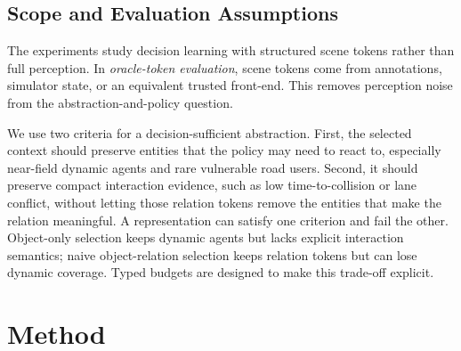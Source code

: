 \documentclass[10pt,journal,compsoc]{IEEEtran}
\begin{document}

\subsection{Scope and Evaluation Assumptions}
The experiments study decision learning with structured scene tokens rather than full perception. In \emph{oracle-token evaluation}, scene tokens come from annotations, simulator state, or an equivalent trusted front-end. This removes perception noise from the abstraction-and-policy question. 


We use two criteria for a decision-sufficient abstraction. First, the selected context should preserve entities that the policy may need to react to, especially near-field dynamic agents and rare vulnerable road users. Second, it should preserve compact interaction evidence, such as low time-to-collision or lane conflict, without letting those relation tokens remove the entities that make the relation meaningful. A representation can satisfy one criterion and fail the other. Object-only selection keeps dynamic agents but lacks explicit interaction semantics; naive object-relation selection keeps relation tokens but can lose dynamic coverage. Typed budgets are designed to make this trade-off explicit.

\section{Method}
\end{document}

